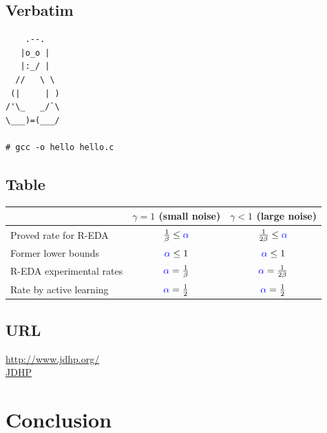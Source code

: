 \documentclass{article}
\begin{document}
\begin{small}
    
\end{small}


\subsection{Verbatim}\label{subsec:verbatim}

\begin{verbatim}
    .--.
   |o_o |
   |:_/ |
  //   \ \
 (|     | )
/'\_   _/`\
\___)=(___/

# gcc -o hello hello.c
\end{verbatim}


\subsection{Table}\label{subsec:table}

\begin{tabular}{|l|c|c|}
\hline
                          & $\gamma=1$ (small noise)                      & $\gamma<1$ (large noise) \\
\hline
Proved rate for R-EDA     & $\frac{1}{\beta} \leq {\color{blue} \alpha}$  & $\frac{1}{2\beta} \leq {\color{blue} \alpha}$ \\
\hline
Former lower bounds       & ${\color{blue} \alpha} \leq 1$                & ${\color{blue} \alpha} \leq 1$ \\
\hline
R-EDA experimental rates  & ${\color{blue} \alpha} = \frac{1}{\beta}$     & ${\color{blue} \alpha} = \frac{1}{2\beta}$ \\
\hline
\hline
Rate by active learning   & ${\color{blue} \alpha} = \frac{1}{2}$        & ${\color{blue} \alpha} = \frac{1}{2}$   \\
\hline
\end{tabular}


\subsection{URL}\label{subsec:url}

\url{http://www.jdhp.org/}  \\
\href{http://www.jdhp.org/}{JDHP}



\section*{Conclusion}\label{sec:ccl}
 
\end{document}
